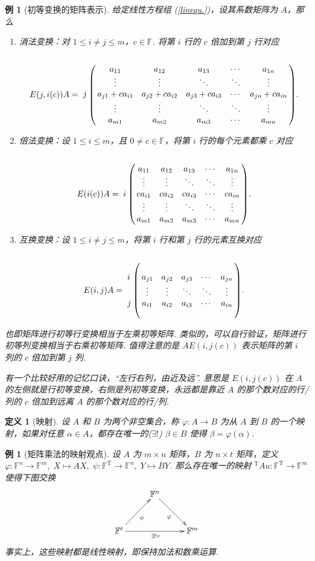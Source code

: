 \documentclass[10pt,openany]{article}
\theoremstyle{thmstyle} %
\theoremstyle{defstyle} %
\newtheorem{definition}[theorem]{定义}
\theoremstyle{prostyle} %
\theoremstyle{exastyle}
\newtheorem{example}[theorem]{例}
\theoremstyle{remstyle}
\newcommand{\T}{^{\text{T}}}
\newcommand{\F}{\mathbb{F}}
\begin{document}
\begin{example}[初等变换的矩阵表示]
	给定线性方程组 (\ref{linequ.})，设其系数矩阵为 \( A \)，那么
	\begin{enumerate}[(1)]
		\item 消法变换：对 \( 1 \leq i \neq j \leq m \)，\( c \in \F \). 将第 \( i \) 行的 \( c \) 倍加到第 \( j \) 行对应
		\[ E(j,i(c))A=\bordermatrix{
			&&&&& \cr
			&a_{11} & a_{12} & a_{13} & \cdots & a_{1n} \cr
			&\vdots & \vdots & \ddots & \ddots & \vdots \cr
			j &a_{j1}+ca_{i1} & a_{j2}+ca_{i2} & a_{j3}+ca_{i3} &  \cdots & a_{jn}+ca_{in} \cr
			&\vdots & \vdots & \ddots & \ddots & \vdots \cr
			&a_{m1} & a_{m2} & a_{m3} & \cdots & a_{mn}
		}. \]
		\item 倍法变换：设 \( 1 \leq i \leq m \)，且 \( 0 \neq c \in \F \)，将第 \( i \) 行的每个元素都乘 \( c \) 对应
		\[ E(i(c))A=\bordermatrix{
			&&&&& \cr
			&a_{11} & a_{12} & a_{13} & \cdots & a_{1n} \cr
			&\vdots & \vdots & \ddots & \ddots & \vdots \cr
			i &ca_{i1} & ca_{i2} & ca_{i3} &  \cdots & ca_{in} \cr
			&\vdots & \vdots & \ddots & \ddots & \vdots \cr
			&a_{m1} & a_{m2} & a_{m3} & \cdots & a_{mn}
		}.  \]
		\item 互换变换：设 \( 1 \leq i \neq j \leq m \)，将第 \( i \) 行和第 \( j \) 行的元素互换对应
		\[ E(i,j)A=\bordermatrix{
			&&&&& \cr
			&&&&& \cr
			i &a_{j1} & a_{j2} & a_{j3} &  \cdots & a_{jn} \cr
			&\vdots & \vdots & \ddots & \ddots & \vdots \cr
			j &a_{i1} & a_{i2} & a_{i3} &  \cdots & a_{in} \cr
			&&&&& 
		}.   \]
	\end{enumerate}
	
	也即矩阵进行初等行变换相当于左乘初等矩阵. 类似的，可以自行验证，矩阵进行初等列变换相当于右乘初等矩阵. 值得注意的是 \( AE(i,j(c)) \) 表示矩阵的第 \( i \) 列的 \( c \) 倍加到第 \( j \) 列. 
	
	有一个比较好用的记忆口诀，“左行右列，由近及远”. 意思是 \( E(i,j(c)) \) 在 \( A \) 的左侧就是行初等变换，右侧是列初等变换，永远都是靠近 \( A \) 的那个数对应的行/列的 \( c \) 倍加到远离 \( A \) 的那个数对应的行/列.
\end{example}

\begin{definition}[映射]
	设 \( A \) 和 \( B \) 为两个非空集合，称 \( \varphi:A \to B \) 为从 \( A \) 到 \( B \) 的一个映射，如果对任意 \( \alpha \in A \)，都存在唯一的(\( \exists !\)) \( \beta \in B \) 使得 \( \beta=\varphi(\alpha) \). 
\end{definition}


\begin{example}[矩阵乘法的映射观点]	\label{1.3.6}
	设 \( A \) 为 \( m \times n \) 矩阵，\( B \) 为 \( n \times t \) 矩阵，定义 \( \varphi: \F^n \to \F^m, \; X \mapsto AX, \; \psi: \F\T \to \F^n, \; Y \mapsto BY \). 那么存在唯一的映射 \( \T Au: \F\T \to \F^m \) 使得下图交换
	\[ \xymatrix@R=7ex@C=6ex{
		 & \F^n\ar"2,3"_{\varphi} & \\
		\F^t\ar"1,2"_{\psi}\ar"2,3"_{\exists ! \tau } &  & \F^m\\
	} \]
	事实上，这些映射都是线性映射，即保持加法和数乘运算.

\end{example}
\end{document}

